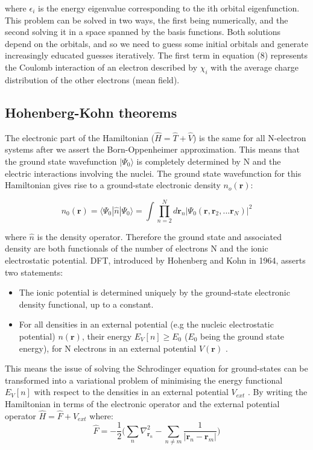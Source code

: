 \documentclass[10pt]{article}
\begin{document}
where $\epsilon_i$ is the energy eigenvalue corresponding to the ith orbital eigenfunction. This problem can be solved in two ways, the first being numerically, and the second solving it in a space spanned by the basis functions. Both solutions depend on the orbitals, and so we need to guess some initial orbitals and generate increasingly educated guesses iteratively. The first term in equation (8) represents the Coulomb interaction of an electron described by $\chi_i$ with the average charge distribution of the other electrons (mean field). 

\subsection{Hohenberg-Kohn theorems}

The electronic part of the Hamiltonian ($\hat{H}=\hat{T}+\hat{V}$) is the same for all N-electron systems after we assert the Born-Oppenheimer approximation. This means that the ground state wavefunction $|\Psi_0\rangle$ is completely determined by N and the electric interactions involving the nuclei. The ground state wavefunction for this Hamiltonian gives rise to a ground-state electronic density $n_o(\mathbf{r})$:

\begin{equation*}
	n_0(\mathbf{r})=\langle\Psi_0|\hat{n}|\Psi_0\rangle = \int\prod_{n=2}^{N}d\mathbf{r}_n|\Psi_0(\mathbf{r},\mathbf{r}_2,...\mathbf{r}_N)|^2
\end{equation*}

where $\hat{n}$ is the density operator. Therefore the ground state and associated density are both functionals of the number of electrons N and the ionic electrostatic potential. DFT, introduced by Hohenberg and Kohn in 1964, asserts two statements:

\begin{itemize}
	\item The ionic potential is determined uniquely by the ground-state electronic density functional, up to a constant.
	\item For all densities in an external potential (e.g the nucleic electrostatic potential) $n(\mathbf{r})$, their energy $E_V[n]\geq E_0$ ($E_0$ being the ground state energy), for N electrons in an external potential $V(\mathbf{r})$ \cite{haynes}. 
\end{itemize}

This means the issue of solving the Schrodinger equation for ground-states can be transformed into a variational problem of minimising the energy functional $E_V[n]$ with respect to the densities in an external potential $V_{ext}$ \cite{hohenberg1964inhomogeneous}. By writing the Hamiltonian in terms of the electronic operator and the external potential operator $\hat{H} = \hat{F}+\hat{V}_{ext}$ where: $$\hat{F} = -\frac{1}{2}\biggr(\sum_n\nabla^2_{\textbf{r}_n}-\sum_{n\not=m}\frac{1}{|\textbf{r}_n-\textbf{r}_m|}\biggr)$$
\end{document}
